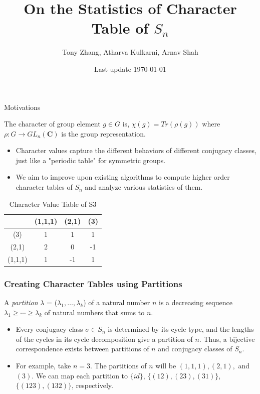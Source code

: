 \documentclass{beamer}
\title[University of Michigan LoG(M)]{On the Statistics of Character Table of $S_n$}
\author{Tony Zhang, Atharva Kulkarni, Arnav Shah}
\institute{University of Michigan}
\date{Last update \today}
\begin{document}
\begin{frame}
\titlepage
\end{frame}

\begin{frame}{Motivations}
    \begin{definition}
        The character of group element $g \in G$ is, $\chi(g) = Tr(\rho(g))$ where $\rho: G \rightarrow GL_n(\mathbf{C})$ is the group representation.\cite{diaconis}
    \end{definition}
    \begin{itemize}
        \item Character values capture the different behaviors of different conjugacy classes, just like a "periodic table" for symmetric groups.
        \item We aim to improve upon existing algorithms to compute higher order character tables of $S_n$ and analyze various statistics of them.
    \end{itemize}
    \begin{table}[htbp]
    \centering
    \label{tab:s3}
    \begin{tabular}{c|c c c}
        & (1,1,1) & (2,1) & (3) \\
        \hline
        (3) & 1 & 1 & 1 \\
        (2,1) & 2 & 0 & -1 \\
        (1,1,1) & 1 & -1 & 1 \\
    \end{tabular}
    \caption{Character Value Table of S3}
\end{table}
\end{frame}

\begin{frame}
\frametitle{Creating Character Tables using Partitions}
\begin{definition} 
    A \textit{partition} $\lambda$ = ($\lambda_{1}, \dotsc, \lambda_{k}$) of a natural number $n$ is a decreasing sequence $\lambda_{1} \geq \dotsb \geq \lambda_{k}$ of natural numbers that sums to $n$.
    \label{def:partition} 
\end{definition}

\begin{itemize}
    \item Every conjugacy class $\sigma \in S_{n}$ is determined by its cycle type, and the lengths of the cycles in its cycle decomposition give a partition of $n$. Thus, a bijective correspondence exists between partitions of $n$ and conjugacy classes of $S_{n}$. 
    \item For example, take $n=3$. The partitions of $n$ will be $(1,1,1), (2,1),$ and $(3)$. We can map each partition to $\{id\}$, $\{(12), (23), (31)\}$, $\{(123), (132)\}$, respectively.
    
\end{itemize}
\end{frame}
\end{document}
